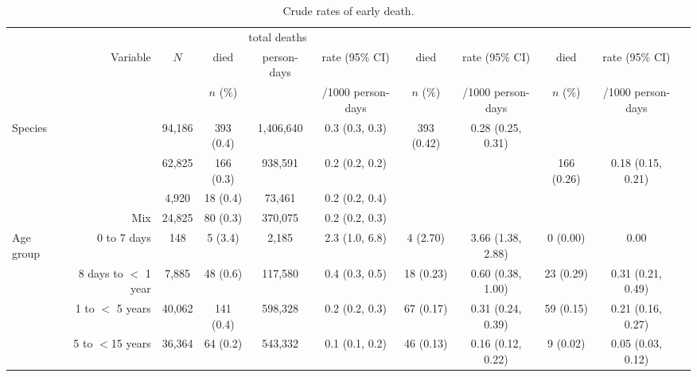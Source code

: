 \begin{landscape}
\singlespacing
\begin{table}\centering
\caption{Crude rates of early death.
\label{table:tabDiedRate}}
\begin{tabular}{lrccccccccc}
\toprule
								&									&			 \multicolumn{4}{c}{total deaths}						& \multicolumn{2}{c}{\pf} 	& \multicolumn{2}{c}{\pv}						\\
\cmidrule(lr){3-6}  \cmidrule(lr){7-8}  \cmidrule(lr){9-10}

								&	Variable                      	&    $N$      	& died 				& person-days 				&  rate (95\% CI) 	 		& died 			  &  rate (95\% CI)		& died 		&  rate (95\% CI)		\\
								&									&				& $n$ (\%)			& 	 	  					 &	/1000 person-days 		& $n$ (\%)		  & /1000 person-days  	& $n$ (\%)		& /1000 person-days 	 \\
\midrule
Species							&	\pf               			& 94,186    	&  393 (0.4)			 & 1,406,640 				& 0.3 (0.3, 0.3)  &  393 (0.42)   &  0.28 (0.25, 0.31)  &	             &   					\\    
								&	\pv                	 		& 62,825    	&  166 (0.3)			 & 938,591   				& 0.2 (0.2, 0.2)  &               & 					&	166 (0.26)   &  0.18 (0.15, 0.21)   \\    
								&	\pma                        & 4,920     	&   18 (0.4)			 & 73,461    				& 0.2 (0.2, 0.4)  &               & 					&	             &   					\\    
								&	Mix                       	& 24,825    	&   80 (0.3)			 & 370,075   				& 0.2 (0.2, 0.3)  &               & 					&	             &   					\\	  [3.5pt]
Age group						&	0 to 7 days                 & 148         	&    5 (3.4)			 & 2,185     				& 2.3 (1.0, 6.8)  &    4 (2.70)   &  3.66 (1.38, 2.88)  &	  0 (0.00)   &  0.00   				 \\   
								&	8 days to $<$ 1 year        & 7,885       	&   48 (0.6)			 & 117,580   				& 0.4 (0.3, 0.5)  &   18 (0.23)   &  0.60 (0.38, 1.00)  &	 23 (0.29)   &  0.31 (0.21, 0.49)   \\    
								&	1 to $<$ 5 years            & 40,062      	&  141 (0.4)			 & 598,328   				& 0.2 (0.2, 0.3)  &   67 (0.17)   &  0.31 (0.24, 0.39)  &	 59 (0.15)   &  0.21 (0.16, 0.27)   \\	  
								&	5 to $<$15 years            & 36,364      	&   64 (0.2)			 & 543,332   				& 0.1 (0.1, 0.2)  &   46 (0.13)   &  0.16 (0.12, 0.22)  &	  9 (0.02)   &  0.05 (0.03, 0.12)   \\    [3.5pt]

\end{tabular}
\end{table}
\end{landscape}
